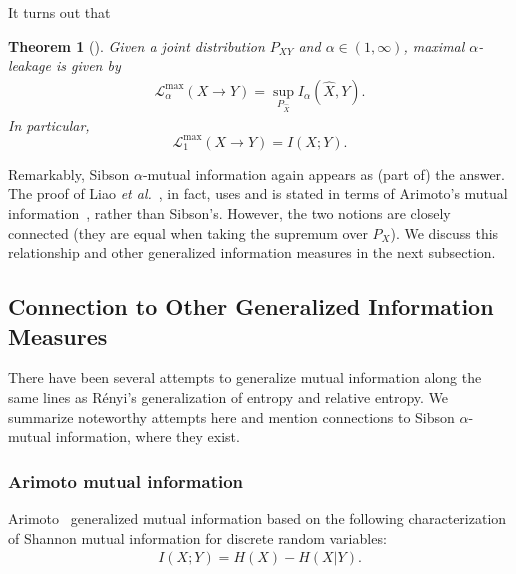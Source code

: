 \documentclass{article}
\newtheorem{theorem}{Theorem}
\numberwithin{theorem}{section}
\numberwithin{example}{section}
\numberwithin{remark}{section}
\numberwithin{definition}{section}
\newcommand{\revised}[1]{{\color{black} #1}}
\begin{document}
It turns out that
\begin{theorem}[\cite{LiaoKSC:19}]
    \label{thm:max-alpha-leakage}
    Given a joint distribution $P_{XY}$ and $\alpha \in (1,\infty)$, maximal $\alpha$-leakage is given by
    \begin{align}
        \label{eq:max-alpha-leakage}
        \mathcal{L}_\alpha^{\mathrm{max}} (X \!\! \to \!\! Y) = \sup_{P_{\hat{X}}} I_\alpha(\hat{X},Y).
    \end{align}
    \revised{In particular,
    \begin{equation}
         \mathcal{L}_1^{\mathrm{max}} (X \!\! \to \!\! Y) = I(X;Y).
    \end{equation}}
    
\end{theorem}

\revised{Remarkably, Sibson $\alpha$-mutual information again appears as (part of) the answer. The proof of Liao \emph{et al.}~\cite{LiaoKSC:19}, in fact, uses and is stated in terms of Arimoto's mutual information~\cite{arimoto:77}, rather than Sibson's. However, the two notions are closely connected (they are equal when taking the supremum over $P_X$). We discuss this relationship and other generalized information measures in the next subsection.}


\subsection{Connection to Other Generalized Information Measures}\label{sec:otherRenyiInformations}

There have been several attempts to generalize mutual information along the same lines as R\'enyi's generalization of entropy and relative entropy. We summarize noteworthy attempts here and mention connections to Sibson $\alpha$-mutual information, where they exist.

\subsubsection{Arimoto mutual information}

Arimoto~\cite{arimoto:77} generalized mutual information based on the following characterization of Shannon mutual information for discrete random variables:
\begin{align}
    I(X;Y) = H(X) - H(X|Y).
\end{align}
\end{document}
